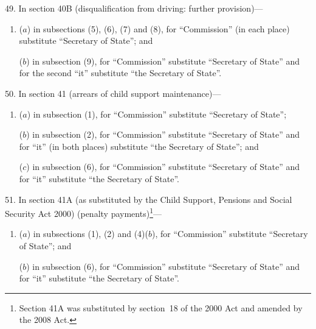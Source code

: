 \documentclass[12pt,a4paper]{article}
\begin{document}
\medskip

49.  In section 40B (disqualification from driving: further provision)—
\begin{enumerate}\item[]
($a$) in subsections (5), (6), (7) and (8), for “Commission” (in each place) substitute “Secretary of State”; and

($b$) in subsection (9), for “Commission” substitute “Secretary of State” and for the second “it” substitute “the Secretary of State”.
\end{enumerate}

\medskip

50.  In section 41 (arrears of child support maintenance)—
\begin{enumerate}\item[]
($a$) in subsection (1), for “Commission” substitute “Secretary of State”;

($b$) in subsection (2), for “Commission” substitute “Secretary of State” and for “it” (in both places) substitute “the Secretary of State”; and

($c$) in subsection (6), for “Commission” substitute “Secretary of State” and for “it” substitute “the Secretary of State”.
\end{enumerate}

\medskip

51.  In section 41A (as substituted by the Child Support, Pensions and Social Security Act 2000) (penalty payments)\footnote{Section 41A was substituted by section~18 of the 2000 Act and amended by the 2008 Act.
}—
\begin{enumerate}\item[]
($a$) in subsections (1), (2) and (4)($b$), for “Commission” substitute “Secretary of State”; and

($b$) in subsection (6), for “Commission” substitute “Secretary of State” and for “it” substitute “the Secretary of State”.
\end{enumerate}

\medskip
\end{document}
